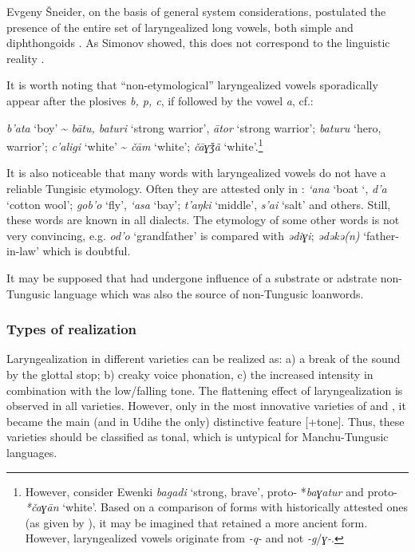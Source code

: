 \documentclass[output=paper,colorlinks,citecolor=brown]{langscibook}
\begin{document}
Evgeny Šneider, on the basis of general system considerations, postulated the presence of the entire set of laryngealized long vowels, both simple and diphthongoids \citep[83]{Shneider1936}. As Simonov showed, this does not correspond to the linguistic reality \citep{Simonov1988}.

It is worth noting that “non-etymological” laryngealized vowels sporadically appear after the plosives \textit{b, p, c}, if followed by the vowel \textit{a}, cf.: 

\ea
    \label{example7.25}
 \textit{b’ata} ‘boy’ {\textasciitilde}  \textit{bātu, baturi} ‘strong warrior’,  \textit{ātor} ‘strong warrior’;  \textit{baturu} ‘hero, warrior’;
\ex
    \label{example7.26}
 \textit{c’aligi} ‘white’ {\textasciitilde}  \textit{čām} ‘white’;  \textit{čāɣǯã} ‘white’.\footnote{However, consider Ewenki \textit{bagadi} ‘strong, brave’, proto- *\textit{ba{ɣ}atur} and proto- \textit{*ča{ɣ}ān} ‘white’. Based on a comparison of  forms with historically attested  ones (as given by \citealt{Cincius1975P}), it may be imagined that  retained a more ancient form. However,  laryngealized vowels originate from \textit{-q-} and not \textit{-g}/\textit{ɣ-}.}
\z

It is also noticeable that many  words with laryngealized vowels do not have a reliable Tungisic etymology. Often they are attested only in : \textit{‘ana} ‘boat ‘, \textit{d’a} ‘cotton wool’; \textit{gob’o} ‘fly’, \textit{‘asa} ‘bay’; \textit{t’aŋki} ‘middle’, \textit{s’ai} ‘salt’ and others. Still, these words are known in all  dialects. The etymology of some other words is not very convincing, e.g. \textit{od’o} ‘grandfather’ is compared with  \textit{{ə}di{ɣ}i};  \textit{{ə}d{ə}k{ə}(n)} ‘father-in-law’ which is doubtful. 

It may be supposed that  had undergone influence of a substrate or adstrate non-Tungusic language which was also the source of non-Tungusic loanwords.

\subsubsection{Types of realization}

Laryngealization in different  varieties can be realized as: a) a break of the sound by the glottal stop; b) creaky voice phonation, c) the increased intensity in combination with the low/falling tone. The flattening effect of laryngealization is observed in all  varieties. However, only in the most innovative varieties of  and , it became the main (and in  Udihe the only) distinctive feature [+tone]. Thus, these varieties should be classified as tonal, which is untypical for Manchu-Tungusic languages.
\end{document}
